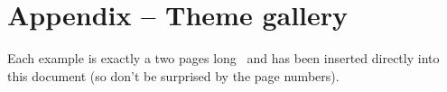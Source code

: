 \documentclass[10pt, a4paper]{tutodoc}
\begin{document}
\bgroup
	\titleformat{\section}[block]{\Huge\bfseries\filcenter}{}{1em}{}
	\section*{Appendix -- Theme gallery}%
	\label{tutodoc-theme-gallery}
\egroup

\bigskip

\begin{tdocnote}
	Each example is exactly a two pages long \pdf\ and has been inserted directly into this document (so don't be surprised by the page numbers).
\end{tdocnote}
\end{document}

